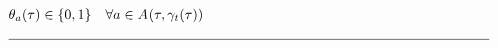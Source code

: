 \begin{alignat}{2}
	& \VarIncludeActivity{\ElementActivity} \in \{0, 1\}                                                                                                                                      \quad \forall \ElementActivity \in \SetActivity{\VarSupervisorAssignment{}{\ElementTechnician}}{}                                                                                                     \\ 
	& \text{\rule{\linewidth}{0.4pt}} \notag
\end{alignat}
